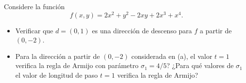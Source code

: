 \documentclass{article}
\newenvironment{theorem}[2][Ejercicio]{\begin{trivlist}
\item[\hskip \labelsep {\bfseries #1}\hskip \labelsep {\bfseries #2.}]}{\end{trivlist}}
\begin{document}
\vspace{0.25in}

\begin{theorem}{3}
    Considere la función
    \[
        f(x,y) = 2x^2 + y^2 - 2xy + 2x^3 + x^4.
    \]

    \begin{itemize}
        \item[(a)] Verificar que \(d = (0,1)\) es una dirección de descenso para \(f\) a partir de \((0,-2)\).

        \item[(b)] Para la dirección a partir de \((0,-2)\) considerada en (a), el valor \(t=1\) verifica
              la regla de Armijo con parámetro \(\sigma_1 = 4/5\)?
              ¿Para qué valores de \(\sigma_1\) el valor de longitud de paso \(t=1\) verifica la regla de Armijo?
    \end{itemize}
\end{theorem}
\end{document}
